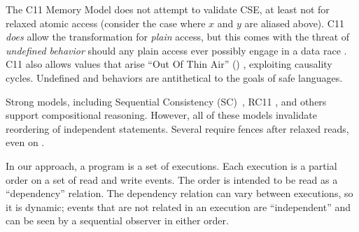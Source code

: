 The C11 Memory Model \cite{Batty:2011:MCC:1926385.1926394} does not attempt
to validate CSE, at least not for relaxed atomic access (consider the case
where $x$ and $y$ are aliased above).  C11 \emph{does} allow the
transformation for \emph{plain} access, but this comes with the threat of
\emph{undefined behavior} should any plain access ever possibly engage in a
data race \cite{undefined}.  C11 also allows values that arise ``Out Of Thin
Air'' (\oota) \cite{DBLP:conf/esop/BattyMNPS15}, exploiting causality cycles.
Undefined and \oota{} behaviors are antithetical to the goals of safe
languages.




Strong models, including Sequential Consistency
(SC)~\citep{Lamport:1979:MMC:1311099.1311750}, RC11
\citep{DBLP:conf/pldi/LahavVKHD17}, and others
\citep{Dolan:2018:BDR:3192366.3192421,DBLP:conf/pldi/LahavVKHD17,DBLP:conf/lics/JeffreyR16,Boehm:2014:OGA:2618128.2618134}
support compositional reasoning.  However, all of these models invalidate
reordering of independent statements.  Several require fences after relaxed
reads, even on \armeight.



In our approach, a program is a set of executions.  Each execution is a
partial order on a set of read and write events.  The order is intended to be
read as a ``dependency'' relation.  The dependency relation can vary between
executions, so it is dynamic; events that are not related in an execution are
``independent'' and can be seen by a sequential observer in either order.

